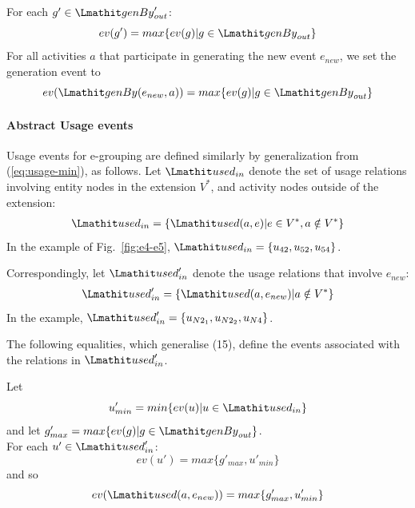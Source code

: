 \vspace*{10pt}
\begin{definition}
\label{def:abstract-gen-e}
For each $g' \in \wgby'_{out}$:
\[
ev(g') = max \{ ev(g) | g \in \wgby_{out} \}  
\]
For all activities $a$ that participate in generating the new event $e_{new}$, we set the generation event to
\[
ev(\wgby(e_{new},a)) = max \{ ev(g) | g \in \wgby_{out} \}
\]
\end{definition}


\paragraph*{\textbf{Abstract Usage events}}
Usage events for e-grouping are defined similarly by generalization from (\ref{eq:usage-min}), as follows.
%
Let $\used_{in}$ denote the set of usage relations involving entity nodes in the extension
$V^*$, and activity nodes outside of the extension:
\begin{align*} 
\used_{in} = \{ \used(a,e) |  e \in V^*,  a \notin V^* \}
\end{align*} 
In the example of Fig.~\ref{fig:e4-e5}, $\used_{in} = \{ u_{42}, u_{52}, u_{54} \}$.

%
Correspondingly, let 
$\used'_{in}$ denote the usage relations that involve $e_{new}$:
\begin{align*} 
\used'_{in} = \{ \used(a, e_{new}) | a \notin V^* \}
\end{align*} 
In the example, $\used'_{in} = \{ u_{N2_1}, u_{N2_2}, u_{N4}  \}$.

The following equalities, which generalise (15), define the events associated with the relations in $\used'_{in}$.

\vspace*{10pt}
\begin{definition} 
\label{def:abstract-usage-e}
Let
\[u'_{min} = min \{ ev(u) | u \in \used_{in} \}\] and let 
$g'_{max} = max \{ ev(g) | g \in \wgby_{out}\} $.\\
For each $u' \in \used'_{in}$:
\begin{equation*}
ev(u') = max \{ g'_{max} , u'_{min} \}
\end{equation*}
and so
\begin{equation}
ev(\used(a,e_{new})) = max \{ g'_{max} , u'_{min} \}
\end{equation}
\end{definition}

